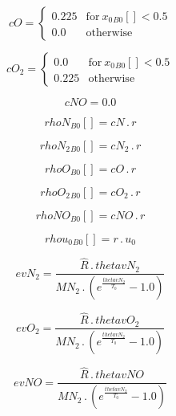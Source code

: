 \documentclass{article}
\begin{document}
\begin{dmath}cO = \begin{cases} 0.225 & \text{for}\: {x_{0}{_{B0}}}[{}] < 0.5 \\0.0 & \text{otherwise} \end{cases}\end{dmath}

\begin{dmath}cO_{2} = \begin{cases} 0.0 & \text{for}\: {x_{0}{_{B0}}}[{}] < 0.5 \\0.225 & \text{otherwise} \end{cases}\end{dmath}

\begin{dmath}cNO = 0.0\end{dmath}

\begin{dmath}{rhoN{_{B0}}}[{}] = cN \,.\, r\end{dmath}

\begin{dmath}{rhoN_{2}{_{B0}}}[{}] = cN_{2} \,.\, r\end{dmath}

\begin{dmath}{rhoO{_{B0}}}[{}] = cO \,.\, r\end{dmath}

\begin{dmath}{rhoO_{2}{_{B0}}}[{}] = cO_{2} \,.\, r\end{dmath}

\begin{dmath}{rhoNO{_{B0}}}[{}] = cNO \,.\, r\end{dmath}

\begin{dmath}{rhou_{0}{_{B0}}}[{}] = r \,.\, u_{0}\end{dmath}

\begin{dmath}evN_{2} = \frac{\hat{R} \,.\, thetavN_{2}}{MN_{2} \,.\, \left(e^{\frac{thetavN_{2}}{T_{0}}} - 1.0\right)}\end{dmath}

\begin{dmath}evO_{2} = \frac{\hat{R} \,.\, thetavO_{2}}{MN_{2} \,.\, \left(e^{\frac{thetavN_{2}}{T_{0}}} - 1.0\right)}\end{dmath}

\begin{dmath}evNO = \frac{\hat{R} \,.\, thetavNO}{MN_{2} \,.\, \left(e^{\frac{thetavN_{2}}{T_{0}}} - 1.0\right)}\end{dmath}
\end{document}
